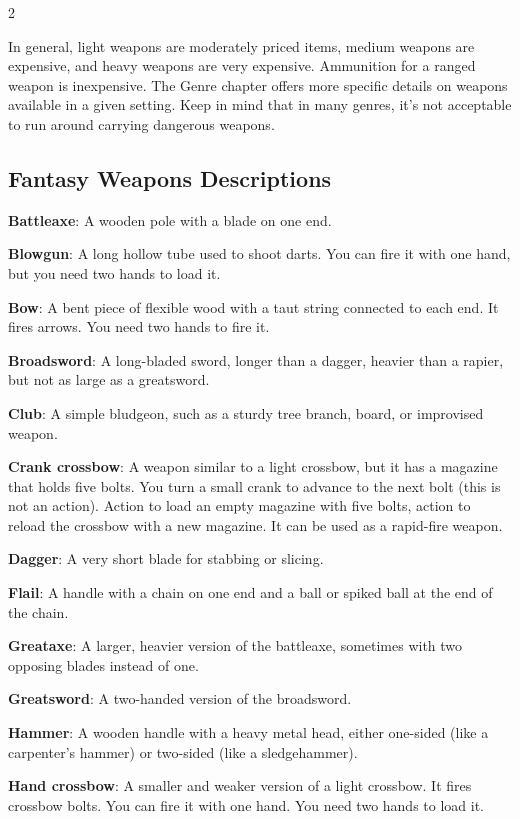 \begin{multicols}{2}

In general, light weapons are moderately priced items, medium weapons are expensive, and heavy weapons are very expensive. Ammunition for a ranged weapon is inexpensive. The Genre chapter offers more specific details on weapons available in a given setting. Keep in mind that in many genres, it’s not acceptable to run around carrying dangerous weapons.

\subsection{Fantasy Weapons Descriptions}

\textbf{Battleaxe}: A wooden pole with a blade on one end. 

\textbf{Blowgun}: A long hollow tube used to shoot darts. You can fire it with one hand, but you need two hands to load it. 

\textbf{Bow}: A bent piece of flexible wood with a taut string connected to each end. It fires arrows. You need two hands to fire it. 

\textbf{Broadsword}: A long-bladed sword, longer than a dagger, heavier than a rapier, but not as large as a greatsword. 

\textbf{Club}: A simple bludgeon, such as a sturdy tree branch, board, or improvised weapon. 

\textbf{Crank crossbow}: A weapon similar to a light crossbow, but it has a magazine that holds five bolts. You turn a small crank to advance to the next bolt (this is not an action). Action to load an empty magazine with five bolts, action to reload the crossbow with a new magazine. It can be used as a rapid-fire weapon.

\textbf{Dagger}: A very short blade for stabbing or slicing. 

\textbf{Flail}: A handle with a chain on one end and a ball or spiked ball at the end of the chain. 

\textbf{Greataxe}: A larger, heavier version of the battleaxe, sometimes with two opposing blades instead of one. 

\textbf{Greatsword}: A two-handed version of the broadsword. 

\textbf{Hammer}: A wooden handle with a heavy metal head, either one-sided (like a carpenter’s hammer) or two-sided (like a sledgehammer). 

\textbf{Hand crossbow}: A smaller and weaker version of a light crossbow. It fires crossbow bolts. You can fire it with one hand. You need two hands to load it. 


\end{multicols}
